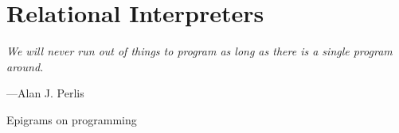 \chapter{Relational Interpreters}

\vspace{-1.5cm}
\begin{fullwidth}
\begin{flushright}
\Large
\textit{We will never run out of things to program as long as there is a single program around.}

\wspace

---Alan J. Perlis

\noindent
Epigrams on programming\nocite{Perlis:1982:SFE:947955.1083808}
\normalsize
\end{flushright}
\end{fullwidth}
